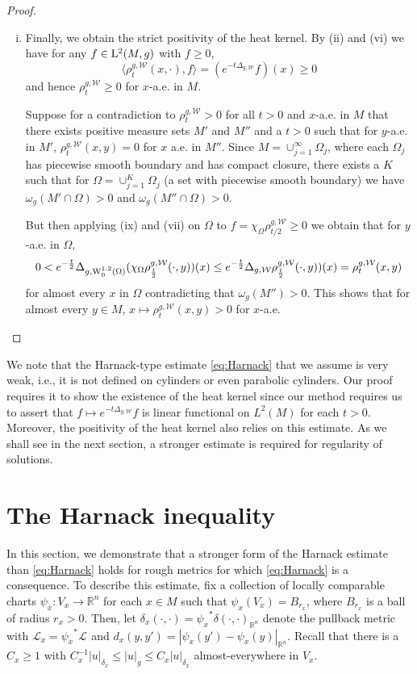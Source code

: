 \documentclass[AMS,STIX1COL]{WileyNJD-v2}
\numberwithin{equation}{section}
\renewcommand{\~}{\tilde}
\renewcommand{\-}{\bar}
\newcommand{\R}{\mathbb{R}}
\newcommand{\8}{\infty}
\newcommand{\cW}{\mathcal{W}}
\newcommand{\modulus}[1]{|#1|}
\newcommand{\script}[1]{\mathscr{#1}}
\newcommand{\union}{\cup}
\newcommand{\intersect}{\cap}
\newcommand{\pullb}[1]{{#1}^\ast}			%
\newcommand{\inprod}[1]{\langle #1 \rangle}	%
\newcommand{\Leb}[1][{}]{\script{L}^{#1}}			%
\newcommand{\Lp}[2][{}]{{\rm L}^{#2}_{\rm #1}}		%
\newcommand{\Sob}[2][{}]{{\rm W}^{#2}_{\rm #1}}		%
\newcommand{\SobH}[2][{}]{{\Sob[#1]{#2,2}}}	%
\newcommand{\hk}{\rho}
\begin{document}
\begin{proof}
\begin{enumerate}[(i)]
\item Finally, we obtain the strict positivity of the heat kernel. By (ii) and (vi) we have for any $f \in \Lp{2}(M, g)$ with $f \geq 0$,
        $$\inprod{\hk^{g,\cW}_t(x,\cdot), f} = (e^{-t \Delta_{g,\cW}}f) (x) \geq 0$$
        and hence $\hk_t^{g,\cW} \geq 0$ for $x$-a.e. in $M$.

        Suppose for a contradiction to $\hk_t^{g,\cW} > 0$ for all $t > 0$ and $x$-a.e. in $M$ that there exists positive measure sets $M'$ and $M''$ and a $t > 0$ such that for $y$-a.e. in $M'$, $\hk^{g,\cW}_t(x,y) = 0$ for $x$ a.e. in $M''$.
	Since $M = \union_{j=1}^\infty \Omega_j$, where each $\Omega_j$ has piecewise smooth boundary and has compact closure, 
	there exists a $K$ such that for $\Omega = \union_{j=1}^K \Omega_j$ (a set with piecewise smooth boundary) we have $\omega_g(M' \intersect \Omega) > 0$ and $\omega_g(M'' \intersect \Omega) > 0$.
        
	But then applying (ix) and (vii) on $\Omega$ to $f = \chi_{\Omega} \hk^{g,\cW}_{t/2} \geq 0$ we obtain that for $y$-a.e. in $\Omega$,
	$$0 < e^{-\frac{t}{2}} \Delta_{g,\SobH[0]{1}(\Omega)}(\chi_{\Omega} \hk^{g,\cW}_{\frac{t}{2}}(\cdot,y))(x) \leq e^{-\frac{t}{2}} \Delta_{g,\cW}\hk^{g,\cW}_{\frac{t}{2}}(\cdot,y))(x)  = \hk^{g,\cW}_{t}(x,y)$$
	for almost every $x$ in $\Omega$ contradicting that $\omega_g(M'') > 0$.
        This shows that for almost every $y \in M$, $x \mapsto \hk^{g,\cW}_t(x,y) > 0$ for $x$-a.e.
	\qedhere
\end{enumerate} 
\end{proof}

\begin{rem}
We note that the Harnack-type estimate \eqref{eq:Harnack} that we assume is very weak, i.e., it is not defined on cylinders or even parabolic cylinders. 
Our proof requires it to show the existence of the heat kernel since our method requires us to assert that   $f \mapsto e^{-t \Delta_{g,\cW}}f$ is  linear functional on $L^2(M)$ for each $t > 0$.
Moreover, the positivity of the heat kernel also relies on this estimate.
As we shall see in the next section, a stronger estimate is required for regularity of solutions. 
\end{rem}

\section{The Harnack inequality}
\label{sec:harnack}

In this section, we demonstrate that a
stronger form of the  Harnack 
estimate than \eqref{eq:Harnack} holds for rough 
metrics for which  \eqref{eq:Harnack} is a consequence.
To describe this estimate, fix a collection of 
locally comparable charts $\psi_x:V_x \to \R^n$ 
for each $x \in M$ such that $\psi_x(V_x) = B_{r_x}$,
where $B_{r_x}$ is a ball of radius $r_x > 0$. 
Then, let
$\delta_x(\cdot, \cdot) = \pullb{\psi_x}\delta(\cdot, \cdot)_{\R^n}$
denote the pullback metric with $\Leb_x = \pullb{\psi_x}\Leb$
and $d_x(y,y') = \modulus{\psi_x(y') - \psi_x(y)}_{\R^n}$.
Recall that there is a $C_x \geq 1$
with $C_x^{-1}  \modulus{u}_{\delta_x} \leq \modulus{u}_g \leq C_x \modulus{u}_{\delta_x}$
almost-everywhere in $V_x$.
\end{document}
